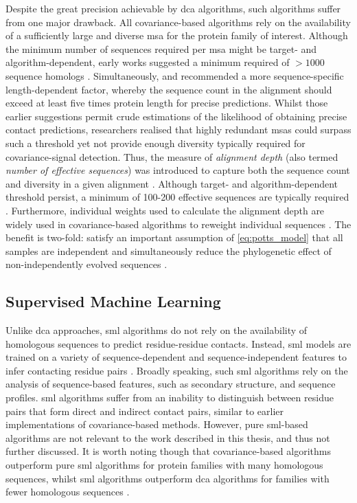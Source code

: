Despite the great precision achievable by \gls{dca} algorithms, such algorithms suffer from one major drawback. All covariance-based algorithms rely on the availability of a sufficiently large and diverse \gls{msa} for the protein family of interest. Although the minimum number of sequences required per \gls{msa} might be target- and algorithm-dependent, early works suggested a minimum required of $>1000$ sequence homologs \cite{Jones2012-ks,Marks2012-ko,Andreani2015-qn}. Simultaneously, \textcite{Marks2011-os} and \textcite{Kamisetty2013-le} recommended a more sequence-specific length-dependent factor, whereby the sequence count in the alignment should exceed at least five times protein length for precise predictions. Whilst those earlier suggestions permit crude estimations of the likelihood of obtaining precise contact predictions, researchers realised that highly redundant \gls{msa}s could surpass such a threshold yet not provide enough diversity typically required for covariance-signal detection. Thus, the measure of \textit{alignment depth} (also termed \textit{number of effective sequences}) was introduced to capture both the sequence count and diversity in a given alignment \cite{Morcos2011-lk,Hopf2012-zl,Skwark2014-qp,Jones2015-vq}. Although target- and algorithm-dependent threshold persist, a minimum of 100-200 effective sequences are typically required \cite{Skwark2014-qp,Jones2015-vq}. Furthermore, individual weights used to calculate the alignment depth are widely used in covariance-based algorithms to reweight individual sequences \cite{Ekeberg2013-ay}. The benefit is two-fold: satisfy an important assumption of \cref{eq:potts_model} that all samples are independent and simultaneously reduce the phylogenetic effect of non-independently evolved sequences \cite{Ekeberg2013-ay}.

\subsection{Supervised Machine Learning}
Unlike \gls{dca} approaches, \acrlong{sml} algorithms do not rely on the availability of homologous sequences to predict residue-residue contacts. Instead, \gls{sml} models are trained on a variety of sequence-dependent and sequence-independent features to infer contacting residue pairs \cite{Du2016-hl,Gonzalez2013-wg,Shackelford2007-iz,Cheng2005-da,Zhang2016-px,Wang2013-wi}. Broadly speaking, such \gls{sml} algorithms rely on the analysis of sequence-based features, such as secondary structure, and sequence profiles. \Gls{sml} algorithms suffer from an inability to distinguish between residue pairs that form direct and indirect contact pairs, similar to earlier implementations of covariance-based methods. However, pure \gls{sml}-based algorithms are not relevant to the work described in this thesis, and thus not further discussed. It is worth noting though that covariance-based algorithms outperform pure \gls{sml} algorithms for protein families with many homologous sequences, whilst \gls{sml} algorithms outperform \gls{dca} algorithms for families with fewer homologous sequences \cite{Skwark2014-qp,Wang2013-wi,Ma2015-vo}. 

